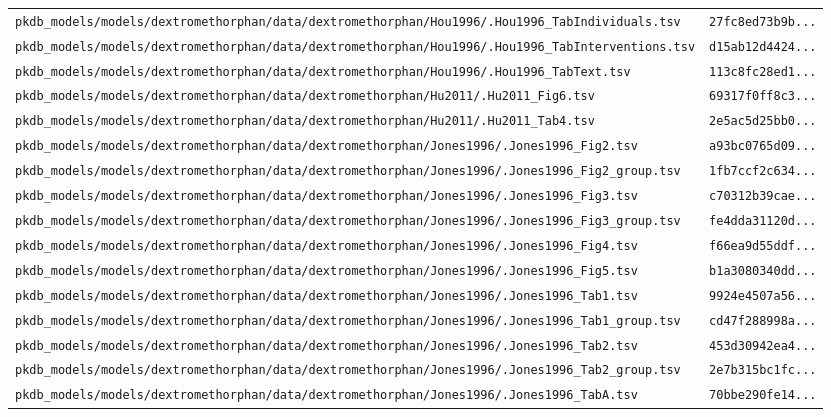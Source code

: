 \documentclass{article}
\begin{document}
\begin{longtable}{ll}
\texttt{pkdb\_models/models/dextromethorphan/data/dextromethorphan/Hou1996/.Hou1996\_TabIndividuals.tsv} & \texttt{27fc8ed73b9b...} \\
\texttt{pkdb\_models/models/dextromethorphan/data/dextromethorphan/Hou1996/.Hou1996\_TabInterventions.tsv} & \texttt{d15ab12d4424...} \\
\texttt{pkdb\_models/models/dextromethorphan/data/dextromethorphan/Hou1996/.Hou1996\_TabText.tsv} & \texttt{113c8fc28ed1...} \\
\texttt{pkdb\_models/models/dextromethorphan/data/dextromethorphan/Hu2011/.Hu2011\_Fig6.tsv} & \texttt{69317f0ff8c3...} \\
\texttt{pkdb\_models/models/dextromethorphan/data/dextromethorphan/Hu2011/.Hu2011\_Tab4.tsv} & \texttt{2e5ac5d25bb0...} \\
\texttt{pkdb\_models/models/dextromethorphan/data/dextromethorphan/Jones1996/.Jones1996\_Fig2.tsv} & \texttt{a93bc0765d09...} \\
\texttt{pkdb\_models/models/dextromethorphan/data/dextromethorphan/Jones1996/.Jones1996\_Fig2\_group.tsv} & \texttt{1fb7ccf2c634...} \\
\texttt{pkdb\_models/models/dextromethorphan/data/dextromethorphan/Jones1996/.Jones1996\_Fig3.tsv} & \texttt{c70312b39cae...} \\
\texttt{pkdb\_models/models/dextromethorphan/data/dextromethorphan/Jones1996/.Jones1996\_Fig3\_group.tsv} & \texttt{fe4dda31120d...} \\
\texttt{pkdb\_models/models/dextromethorphan/data/dextromethorphan/Jones1996/.Jones1996\_Fig4.tsv} & \texttt{f66ea9d55ddf...} \\
\texttt{pkdb\_models/models/dextromethorphan/data/dextromethorphan/Jones1996/.Jones1996\_Fig5.tsv} & \texttt{b1a3080340dd...} \\
\texttt{pkdb\_models/models/dextromethorphan/data/dextromethorphan/Jones1996/.Jones1996\_Tab1.tsv} & \texttt{9924e4507a56...} \\
\texttt{pkdb\_models/models/dextromethorphan/data/dextromethorphan/Jones1996/.Jones1996\_Tab1\_group.tsv} & \texttt{cd47f288998a...} \\
\texttt{pkdb\_models/models/dextromethorphan/data/dextromethorphan/Jones1996/.Jones1996\_Tab2.tsv} & \texttt{453d30942ea4...} \\
\texttt{pkdb\_models/models/dextromethorphan/data/dextromethorphan/Jones1996/.Jones1996\_Tab2\_group.tsv} & \texttt{2e7b315bc1fc...} \\
\texttt{pkdb\_models/models/dextromethorphan/data/dextromethorphan/Jones1996/.Jones1996\_TabA.tsv} & \texttt{70bbe290fe14...} \\

\end{longtable}
\end{document}
